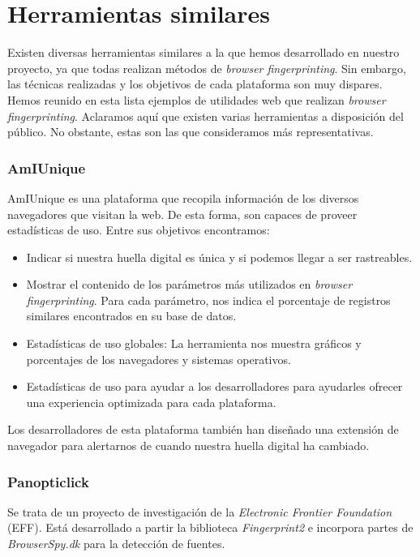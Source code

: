 \section{Herramientas similares}

Existen diversas herramientas similares a la que hemos desarrollado en nuestro proyecto, ya que todas realizan métodos de \textit{browser fingerprinting}. Sin embargo, las técnicas realizadas y los objetivos de cada plataforma son muy dispares. Hemos reunido en esta lista ejemplos de utilidades web que realizan \textit{browser fingerprinting}. Aclaramos aquí que existen varias herramientas a disposición del público. No obstante, estas son las que consideramos más representativas. \par

\subsubsection{AmIUnique}

AmIUnique\cite{amiunique} es una plataforma que recopila información de los diversos navegadores que visitan la web. De esta forma, son capaces de proveer estadísticas de uso. 
Entre sus objetivos encontramos:
\begin{itemize}
	\item Indicar si nuestra huella digital es única y si podemos llegar a ser rastreables.
	\item Mostrar el contenido de los parámetros más utilizados en \textit{browser fingerprinting}. Para cada parámetro, nos indica el porcentaje de registros similares encontrados en su base de datos.
	\item Estadísticas de uso globales: La herramienta nos muestra gráficos y porcentajes de los navegadores y sistemas operativos.
	\item Estadísticas de uso para ayudar a los desarrolladores para ayudarles ofrecer una experiencia optimizada para cada plataforma.
\end{itemize}

Los desarrolladores de esta plataforma también han diseñado una extensión de navegador para alertarnos de cuando nuestra huella digital ha cambiado. \par 

\subsubsection{Panopticlick}

Se trata de un proyecto de investigación de la \textit{Electronic Frontier Foundation} (EFF). Está desarrollado a partir la biblioteca \textit{Fingerprint2}\cite{fingerprintjs2} e incorpora partes de \textit{BrowserSpy.dk}\cite{browserSpy} para la detección de fuentes. \par 

